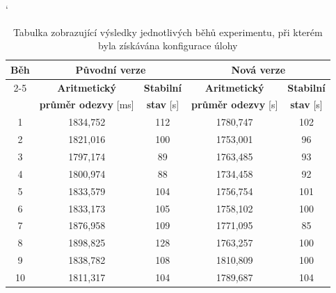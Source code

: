             \begin{table}[ht]
             \catcode`
             \begin{adjustwidth}{-0.5cm}{}
             \begin{center}
              \begin{tabular}{| c || c | c || c | c |} \hline
                \multirow{4}{*}{Běh}  &   \multicolumn{2}{c||}{\textbf{Původní verze}}  &  \multicolumn{2}{c|}{\textbf{Nová verze}}\\ \cline{2-5}
                 & \textbf{Aritmetický} &  \textbf{Stabilní} &  \textbf{Aritmetický}  &  \textbf{Stabilní}\\  
                 & \textbf{průměr odezvy} [ms]  &   \textbf{stav} [s]  &  \textbf{průměr odezvy} [s] &  \textbf{stav} [s]\\\hline
                1 & 1834,752 & 112 &  1780,747 & 102\\\hline
                2  & 1821,016 & 100 & 1753,001 & 96\\\hline
                3 & 1797,174 & 89 & 1763,485 & 93\\\hline
                4 & 1800,974  & 88 & 1734,458 & 92\\\hline
                5 & 1833,579 & 104 & 1756,754 & 101\\\hline\hline
                6 & 1833,173 & 105 & 1758,102 & 100\\\hline
                7 & 1876,958 & 109 & 1771,095 & 85\\\hline
                8 & 1898,825 & 128 & 1763,257 & 100\\\hline
                9 & 1838,782 & 108 & 1810,809 & 100\\\hline
                10 & 1811,317 & 104 & 1789,687 & 104\\\hline
              \end{tabular}
              \caption{Tabulka zobrazující výsledky jednotlivých běhů experimentu, při kterém byla získávána konfigurace úlohy}
              \label{tabGetFreestyleMain}
             \end{center}
            \end{adjustwidth}
            \end{table}

		


